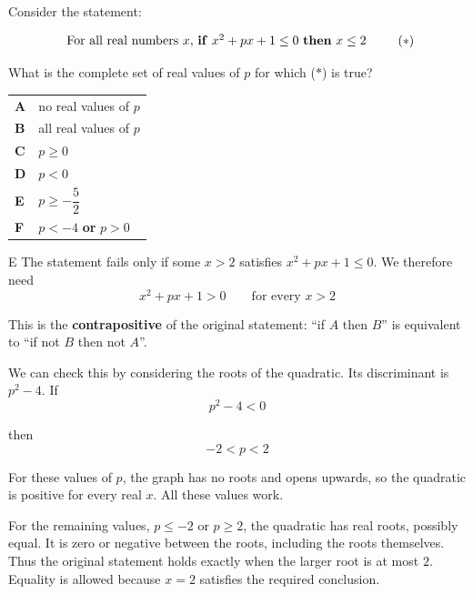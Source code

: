 \documentclass[11pt,a4paper]{article}
\begin{document}
\begin{enumerate}[label=\textbf{\arabic*.},leftmargin=*,itemsep=0pt,start=17]
\questionitem[Polynomials]
Consider the statement:

\[ \begin{array}{c}
\text{For all real numbers $x$, \textbf{if} $x^2+px+1\le 0$ \textbf{then} $x\le 2$}
\end{array} \tag{$\ast$} \]

What is the complete set of real values of $p$ for which ($\ast$) is true?

\par\vspace*{12pt}
\begin{tabularx}{\linewidth}{@{}>{\bfseries}l Y@{}}
A &
no real values of $p$
\\[0.8em]
B &
all real values of $p$
\\[0.8em]
C &
$p\ge 0$
\\[0.8em]
D &
$p<0$
\\[0.8em]
E &
$p\ge -\dfrac{5}{2}$
\\[0.8em]
F &
$p<-4$ \textbf{or} $p>0$
\\
\end{tabularx}

\begin{djsSolution}{E}
The statement fails only if some $x>2$ satisfies $x^2+px+1\le0$. We therefore need
\[
x^2+px+1>0\qquad\text{for every }x>2
\]

This is the \textbf{contrapositive} of the original statement: ``if $A$ then $B$'' is equivalent to ``if not $B$ then not $A$''.

We can check this by considering the roots of the quadratic. Its discriminant is $p^2-4$. If
\[
p^2-4<0
\]

then
\[
-2<p<2
\]

For these values of $p$, the graph has no roots and opens upwards, so the quadratic is positive for every real $x$. All these values work.

For the remaining values, $p\le-2$ or $p\ge2$, the quadratic has real roots, possibly equal. It is zero or negative between the roots, including the roots themselves. Thus the original statement holds exactly when the larger root is at most $2$. Equality is allowed because $x=2$ satisfies the required conclusion.


\end{djsSolution}
\end{enumerate}
\end{document}
